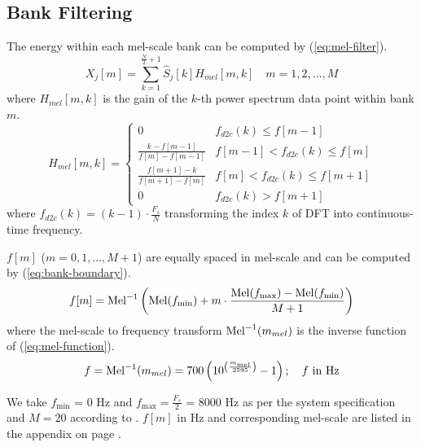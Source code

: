 
\subsection{Bank Filtering}

The energy within each mel-scale bank can be computed by (\ref{eq:mel-filter}).
\begin{equation}
\label{eq:mel-filter}
X_j[m] = \sum^{\frac{N}{2} + 1}_{k=1} \hat{S}_j[k] H_{mel}[m, k] \quad m = 1, 2, \dots, M
\end{equation}
where $H_{mel}[m, k]$ is the gain of the $k$-th power spectrum data point within bank $m$.\\

\begin{equation}
\label{eq:mel-bank-gain}
H_{mel}[m, k] =
\begin{cases}
0 &f_{d2c}(k) \le f[m-1]\\
\displaystyle\frac{k - f[m-1]}{f[m] - f[m-1]} &f[m-1] < f_{d2c}(k) \le f[m]\\
\displaystyle\frac{f[m+1] - k}{f[m+1] - f[m]} &f[m] < f_{d2c}(k) \le f[m+1]\\
0 &f_{d2c}(k) > f[m+1]
\end{cases}
\end{equation}
where $f_{d2c}(k) = (k-1) \cdot \frac{F_s}{N}$ transforming the index $k$ of DFT into continuous-time frequency.

$f[m]$ ($m = 0, 1, \dots, M+1$) are equally spaced in mel-scale and can be computed by (\ref{eq:bank-boundary}).
\begin{equation}
\label{eq:bank-boundary}
f[m] = \operatorname{Mel}^{-1} \left( \operatorname{Mel}(f_{\min}) + m \cdot \frac{\operatorname{Mel}(f_{\max}) - \operatorname{Mel}(f_{\min})}{M + 1} \right)
\end{equation}
where the mel-scale to frequency transform $\operatorname{Mel}^{-1}(m_{mel})$ is the inverse function of (\ref{eq:mel-function}).
\begin{equation}
\label{eq:mel-function-inverse}
f = \operatorname{Mel}^{-1}(m_{mel}) = 700 \left( 10^{\left(\frac{m_{mel}}{2595}\right)} - 1 \right); \quad f \text{ in Hz}
\end{equation}

We take $f_{\min}$ = 0 Hz and $f_{\max} = \frac{F_s}{2}$ = 8000 Hz as per the system specification and $M = 20$ according to \cite{davis1980comparison}. $f[m]$ in Hz and corresponding mel-scale are listed in the appendix on page \pageref{table:frequency-mel-relationship}.

